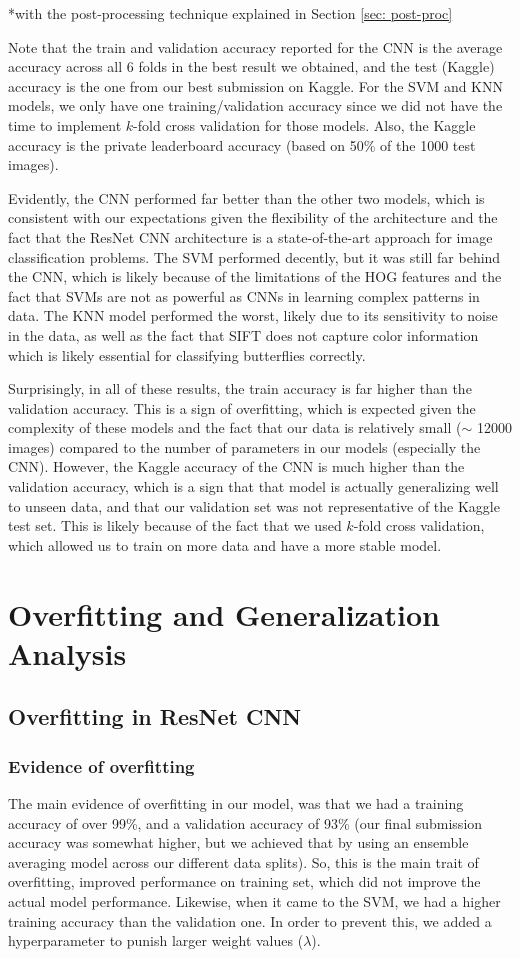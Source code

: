 \documentclass[10pt]{article} %
\begin{document}
*with the post-processing technique explained in Section \ref{sec: post-proc}
\par
Note that the train and validation accuracy reported for the CNN is the average accuracy across all 6 folds in the best result we obtained, and the test (Kaggle) accuracy is the one from our best submission on Kaggle. For the SVM and KNN models, we only have one training/validation accuracy since we did not have the time to implement $k$-fold cross validation for those models. Also, the Kaggle accuracy is the private leaderboard accuracy (based on 50\% of the 1000 test images).

Evidently, the CNN performed far better than the other two models, which is consistent with our expectations given the flexibility of the architecture and the fact that the ResNet CNN architecture is a state-of-the-art approach for image classification problems. The SVM performed decently, but it was still far behind the CNN, which is likely because of the limitations of the HOG features and the fact that SVMs are not as powerful as CNNs in learning complex patterns in data. The KNN model performed the worst, likely due to its sensitivity to noise in the data, as well as the fact that SIFT does not capture color information which is likely essential for classifying butterflies correctly.

Surprisingly, in all of these results, the train accuracy is far higher than the validation accuracy. This is a sign of overfitting, which is expected given the complexity of these models and the fact that our data is relatively small ($\sim$ 12000 images) compared to the number of parameters in our models (especially the CNN). However, the Kaggle accuracy of the CNN is much higher than the validation accuracy, which is a sign that that model is actually generalizing well to unseen data, and that our validation set was not representative of the Kaggle test set. This is likely because of the fact that we used $k$-fold cross validation, which allowed us to train on more data and have a more stable model.


\section{Overfitting and Generalization Analysis}
\subsection{Overfitting in ResNet CNN}
\subsubsection{Evidence of overfitting}
The main evidence of overfitting in our model, was that we had a training accuracy of over 99\%, and a validation accuracy of 93\% (our final submission accuracy was somewhat higher, but we achieved that by using an ensemble averaging model across our different data splits). So, this is the main trait of overfitting, improved performance on training set, which did not improve the actual model performance.
Likewise, when it came to the SVM, we had a higher training accuracy than the validation one. In order to prevent this, we added a hyperparameter to punish larger  weight values ($\lambda$).
\end{document}

